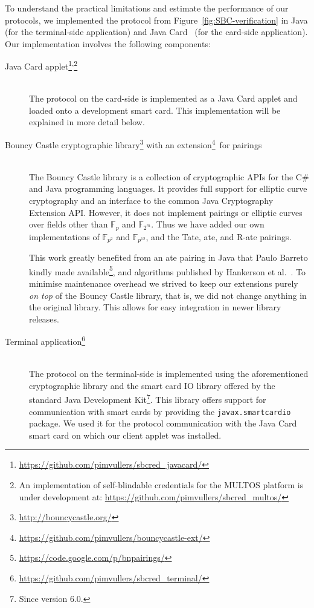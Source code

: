 To understand the practical limitations and estimate the performance of our
protocols, we implemented the protocol from Figure~\ref{fig:SBC-verification}
in Java (for the terminal-side application) and Java Card~\cite{Chen00} (for the
card-side application). Our implementation involves the following components:
\begin{savenotes}
\begin{description}
  \item[Java Card applet\footnote{\url{https://github.com/pimvullers/sbcred_javacard/}
    }\textsuperscript{,}\footnote{An implementation of self-blindable
    credentials for the MULTOS platform is under development at:
    \url{https://github.com/pimvullers/sbcred_multos/}}] ~\\
    The protocol on the card-side is implemented as a Java Card applet and
    loaded onto a development smart card. This implementation will be explained
    in more detail below.

  \item[Bouncy Castle cryptographic library\footnote{\url{http://bouncycastle.org/}}
    with an extension\footnote{\url{https://github.com/pimvullers/bouncycastle-ext/}}\
    for  pairings] ~\\
    The Bouncy Castle library is a collection of
    cryptographic APIs for the C\# and Java programming languages. It provides
    full support for elliptic curve cryptography and an interface to the common
    Java Cryptography Extension API. However, it does not implement pairings or
    elliptic curves over fields other than $\mathbb{F}_p$ and
    $\mathbb{F}_{2^m}$. Thus we have added our own implementations of
    $\mathbb{F}_{p^2}$ and $\mathbb{F}_{p^{12}}$, and the Tate, ate, and R-ate
    pairings.

    This work greatly benefited from an ate pairing in Java that Paulo Barreto
    kindly made available\footnote{\url{https://code.google.com/p/bnpairings/}},
    and algorithms published by Hankerson et al.~\cite{HankersonMS09}. To
    minimise maintenance overhead we strived to keep our extensions purely
    \emph{on top} of the Bouncy Castle library, that is, we did not change
    anything in the original library. This allows for easy integration in newer
    library releases.

  \item[Terminal application\footnote{\url{https://github.com/pimvullers/sbcred_terminal/}}] ~\\
    The protocol on the terminal-side is implemented using the aforementioned
    cryptographic library and the smart card IO library offered by the standard
    Java Development Kit\footnote{Since version 6.0.}. This library offers
    support for communication with smart cards by providing the
    \texttt{javax.smartcardio} package. We used it for the protocol communication
    with the Java Card smart card on which our client applet was installed.
\end{description}
\end{savenotes}

